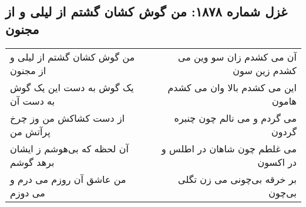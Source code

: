 \begin{center}
\section*{غزل شماره ۱۸۷۸: من گوش کشان گشتم از لیلی و از مجنون}
\label{sec:1878}
\begin{longtable}{l p{0.5cm} r}
من گوش کشان گشتم از لیلی و از مجنون
&&
آن می کشدم زان سو وین می کشدم زین سون
\\
یک گوش به دست این یک گوش به دست آن
&&
این می کشدم بالا وان می کشدم هامون
\\
از دست کشاکش من وز چرخ پرآتش من
&&
می گردم و می نالم چون چنبره گردون
\\
آن لحظه که بی‌هوشم ز ایشان برهد گوشم
&&
می غلطم چون شاهان در اطلس و در اکسون
\\
من عاشق آن روزم می درم و می دوزم
&&
بر خرقه بی‌چونی می زن تگلی بی‌چون
\\
\end{longtable}
\end{center}
